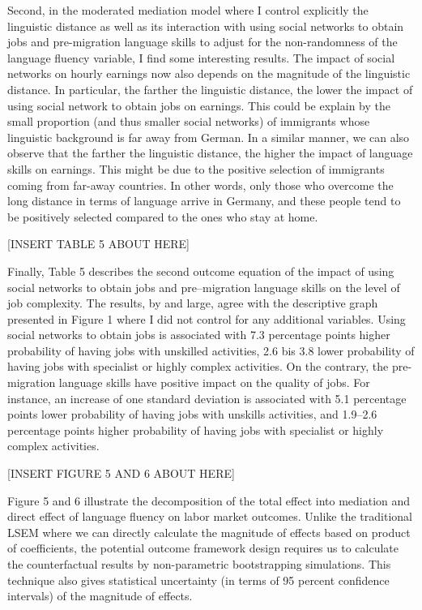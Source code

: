 \documentclass[12pt,a4paper]{article}
\begin{document}
Second, in the moderated mediation model where I control explicitly the linguistic distance as well as its interaction with using social networks to obtain jobs and pre-migration language skills to adjust for the non-randomness of the language fluency variable, I find some interesting results. The impact of social networks on hourly earnings now also depends on the magnitude of the linguistic distance. In particular, the farther the linguistic distance, the lower the impact of using social network to obtain jobs on earnings. This could be explain by the small proportion (and thus smaller social networks) of immigrants whose linguistic background is far away from German. In a similar manner, we can also observe that the farther the linguistic distance, the higher the impact of language skills on earnings. This might be due to the positive selection of immigrants coming from far-away countries. In other words, only those who overcome the long distance in terms of language arrive in Germany, and these people tend to be positively selected compared to the ones who stay at home.

\begin{center}
[INSERT TABLE 5 ABOUT HERE]
\end{center}

Finally, Table 5 describes the second outcome equation of the impact of using social networks to obtain jobs and pre--migration language skills on the level of job complexity. The results, by and large, agree with the descriptive graph presented in Figure 1 where I did not control for any additional variables. Using social networks to obtain jobs is associated with 7.3 percentage points higher probability of having jobs with unskilled activities, 2.6 bis 3.8 lower probability of having jobs with specialist or highly complex activities. On the contrary, the pre-migration language skills have positive impact on the quality of jobs. For instance, an increase of one standard deviation is associated with 5.1 percentage points lower probability of having jobs with unskills activities, and 1.9--2.6 percentage points higher probability of having jobs with specialist or highly complex activities. 


\begin{center}
[INSERT FIGURE 5 AND 6 ABOUT HERE]
\end{center}

Figure 5 and 6 illustrate the decomposition of the total effect into mediation and direct effect of language fluency on labor market outcomes. Unlike the traditional LSEM where we can directly calculate the magnitude of effects based on product of coefficients, the potential outcome framework design requires us to calculate the counterfactual results by non-parametric bootstrapping simulations. This technique also gives statistical uncertainty (in terms of 95 percent confidence intervals) of the magnitude of effects.
\end{document}

